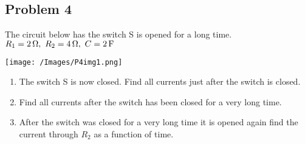 \subsection*{Problem 4}
The circuit below has the switch S is opened for a long time. $R_1=2\units{\Omega},\ R_2=4\units{\Omega},\ C=2\units{F}$\\
\centerline{\texttt{[image: /Images/P4img1.png]}}
\begin{enumerate}
    \item The switch S is now closed. Find all currents just after the switch is closed.
    \item Find all currents after the switch has been closed for a very long time.
    \item After the switch was closed for a very long time it is opened again find the current
    through $R_2$ as a function of time.
\end{enumerate}
